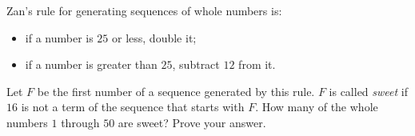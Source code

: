 Zan's rule for generating sequences of whole numbers is:
\begin{itemize}
\item if a number is $25$ or less, double it;
\item if a number is greater than $25$, subtract $12$ from it.
\end{itemize}
Let $F$ be the first number of a sequence generated by this rule. $F$ is called \emph{sweet} if $16$ is not a term of the sequence that starts with $F$. How many of the whole numbers $1$ through $50$ are sweet? Prove your answer.
